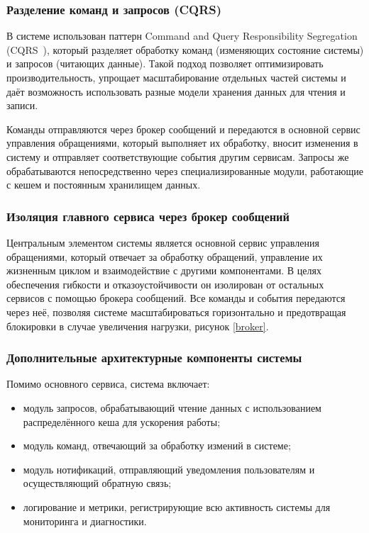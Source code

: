 \subsubsection{Разделение команд и запросов (CQRS)}

В системе использован паттерн Command and Query Responsibility Segregation (CQRS~\cite{CQRS}), который разделяет обработку команд (изменяющих состояние системы) и запросов (читающих данные). Такой подход позволяет оптимизировать производительность, упрощает масштабирование отдельных частей системы и даёт возможность использовать разные модели хранения данных для чтения и записи.

Команды отправляются через брокер сообщений и передаются в основной сервис управления обращениями, который выполняет их обработку, вносит изменения в систему и отправляет соответствующие события другим сервисам. Запросы же обрабатываются непосредственно через специализированные модули, работающие с кешем и постоянным хранилищем данных.

\subsubsection{Изоляция главного сервиса через брокер сообщений}

Центральным элементом системы является основной сервис управления обращениями, который отвечает за обработку обращений, управление их жизненным циклом и взаимодействие с другими компонентами. В целях обеспечения гибкости и отказоустойчивости он изолирован от остальных сервисов с помощью брокера сообщений. Все команды и события передаются через неё, позволяя системе масштабироваться горизонтально и предотвращая блокировки в случае увеличения нагрузки, рисунок \ref{broker}.


\subsubsection{Дополнительные архитектурные компоненты системы}

Помимо основного сервиса, система включает:

\begin{itemize}
    \item модуль запросов, обрабатывающий чтение данных с использованием распределённого кеша для ускорения работы;
    \item модуль команд, отвечающий за обработку измений в системе;
    \item модуль нотификаций, отправляющий уведомления пользователям и осуществляющий обратную связь;
    \item логирование и метрики, регистрирующие всю активность системы для мониторинга и диагностики.
\end{itemize}

